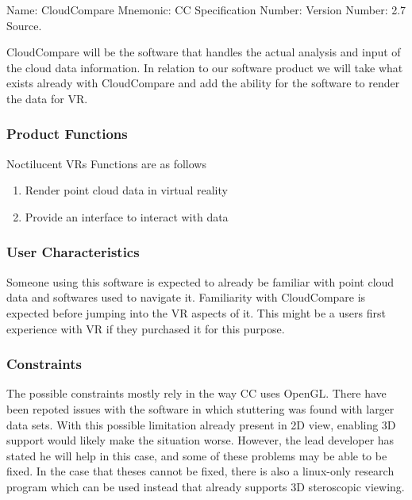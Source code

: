 Name: CloudCompare
Mnemonic: CC
Specification Number:
Version Number: 2.7
Source.

CloudCompare will be the software that handles the actual analysis and input of the cloud data information. 
In relation to our software product we will take what exists already with CloudCompare and add the ability for the software to render the data for VR.

\subsubsection{Product Functions}

Noctilucent VRs Functions are as follows

\begin{enumerate}
\item Render point cloud data in virtual reality
\item Provide an interface to interact with data
\end{enumerate}

\subsubsection{User Characteristics}

Someone using this software is expected to already be familiar with point cloud data and softwares used to navigate it. 
Familiarity with CloudCompare is expected before jumping into the VR aspects of it.
This might be a users first experience with VR if they purchased it for this purpose.

\subsubsection{Constraints}

The possible constraints mostly rely in the way CC uses OpenGL. There have been repoted issues with the software in which
stuttering was found with larger data sets. With this possible limitation already present in 2D view, enabling 3D support would
likely make the situation worse. However, the lead developer has stated he will help in this case, and some of these problems 
may be able to be fixed. In the case that theses cannot be fixed, there is also a linux-only research program which can be used
instead that already supports 3D steroscopic viewing.

